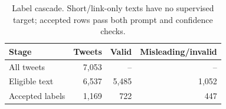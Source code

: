 \begin{table}[t]
\centering
\footnotesize
\caption{Label cascade. Short/link-only texts have no supervised target; accepted rows pass both prompt and confidence checks.}
\label{tab:quality}
\setlength{\tabcolsep}{4pt}
\begin{tabular}{lrrr}
\toprule
Stage & Tweets & Valid & Misleading/invalid \\
\midrule
All tweets & 7,053 & -- & -- \\
Eligible text & 6,537 & 5,485 & 1,052 \\
Accepted labels & 1,169 & 722 & 447 \\
\bottomrule
\end{tabular}
\end{table}
